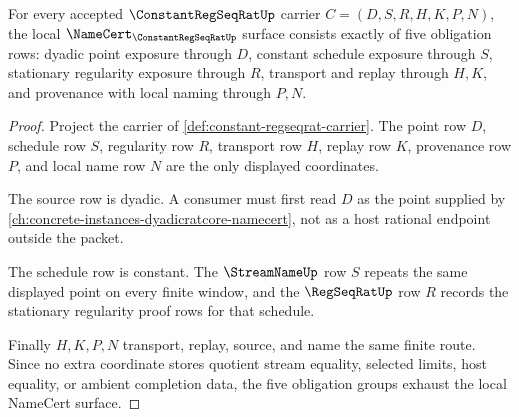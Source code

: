 \begin{theorem}
\label{thm:constant-regseqrat-namecert-obligations}
For every accepted $\ConstantRegSeqRatUp$ carrier $C=(D,S,R,H,K,P,N)$, the local $\NameCert_{\ConstantRegSeqRatUp}$ surface consists exactly of five obligation rows: dyadic point exposure through $D$, constant schedule exposure through $S$, stationary regularity exposure through $R$, transport and replay through $H,K$, and provenance with local naming through $P,N$.
\end{theorem}
\begin{proof}
Project the carrier of \autoref{def:constant-regseqrat-carrier}. The point row $D$, schedule row $S$, regularity row $R$, transport row $H$, replay row $K$, provenance row $P$, and local name row $N$ are the only displayed coordinates.

The source row is dyadic. A consumer must first read $D$ as the point supplied by \autoref{ch:concrete-instances-dyadicratcore-namecert}, not as a host rational endpoint outside the packet.

The schedule row is constant. The $\StreamNameUp$ row $S$ repeats the same displayed point on every finite window, and the $\RegSeqRatUp$ row $R$ records the stationary regularity proof rows for that schedule.

Finally $H,K,P,N$ transport, replay, source, and name the same finite route. Since no extra coordinate stores quotient stream equality, selected limits, host equality, or ambient completion data, the five obligation groups exhaust the local NameCert surface.
\end{proof}

